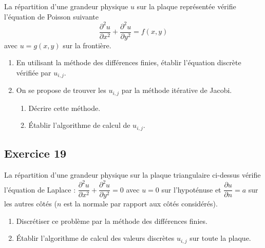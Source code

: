 La répartition d'une grandeur physique $u$ sur la plaque représentée vérifie
l'équation de Poisson suivante
\[
  \frac{\partial^2 u}{\partial x^2} + \frac{\partial^2 u}{\partial y^2} = f(x, y)
\]
avec $u = g(x, y)$ sur la frontière.
\begin{enumerate}[label=\arabic*)-]
  \item En utilisant la méthode des différences finies, établir l'équation
        discrète vérifiée par $u_{i,j}$.
  \item On se propose de trouver les $u_{i,j}$ par la méthode itérative de
        Jacobi.
        \begin{enumerate}[label=\alph*)-]
          \item Décrire cette méthode.
          \item Établir l'algorithme de calcul de $u_{i,j}$.
        \end{enumerate}
\end{enumerate}

\subsection*{Exercice 19}

\begin{center}
\end{center}

La répartition d'une grandeur physique sur la plaque triangulaire ci-dessus
vérifie l'équation de Laplace :
$\dfrac{\partial^2 u}{\partial x^2} + \dfrac{\partial^2 u}{\partial y^2} = 0$
avec $u = 0$ sur l'hypoténuse et $\dfrac{\partial u}{\partial n} = a$ sur les
autres côtés ($n$ est la normale par rapport aux côtés considérés).
\begin{enumerate}[label=\arabic*)-]
  \item Discrétiser ce problème par la méthode des différences finies.
  \item Établir l'algorithme de calcul des valeurs discrètes $u_{i,j}$ sur
        toute la plaque.
\end{enumerate}
